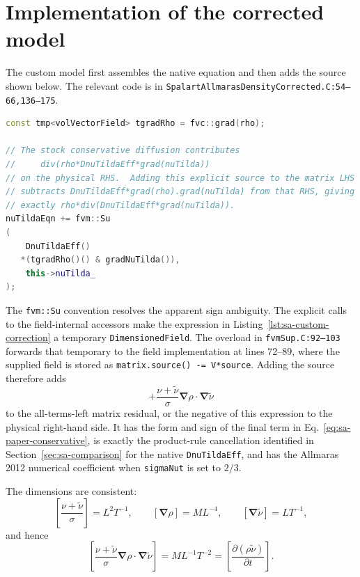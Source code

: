 \documentclass[11pt]{article}
\newcommand{\SAgrad}{\boldsymbol{\nabla}}
\newcommand{\SAcode}[1]{\texttt{#1}}
\begin{document}
\clearpage
\appendix
\section{Implementation of the corrected model}
\label{sec:sa-correction}

The custom model first assembles the native equation and then adds the source
shown below.  The relevant code is in
\SAcode{SpalartAllmarasDensityCorrected.C:54--66,136--175}.
\begin{lstlisting}[style=SAFoam,language=C++,firstnumber=54,
  caption={Density-gradient source in SpalartAllmarasDensityCorrected.},
  label={lst:sa-custom-correction}]
const tmp<volVectorField> tgradRho = fvc::grad(rho);

// The stock conservative diffusion contributes
//     div(rho*DnuTildaEff*grad(nuTilda))
// on the physical RHS.  Adding this explicit source to the matrix LHS
// subtracts DnuTildaEff*grad(rho).grad(nuTilda) from that RHS, giving
// exactly rho*div(DnuTildaEff*grad(nuTilda)).
nuTildaEqn += fvm::Su
(
    DnuTildaEff()
   *(tgradRho()() & gradNuTilda()),
    this->nuTilda_
);
\end{lstlisting}

The \SAcode{fvm::Su} convention resolves the apparent sign ambiguity.  The
explicit calls to the field-internal accessors make the expression in
Listing~\ref{lst:sa-custom-correction} a temporary
\SAcode{DimensionedField}.  The overload in \SAcode{fvmSup.C:92--103}
forwards that temporary to the field implementation at lines 72--89, where the
supplied field is stored as \SAcode{matrix.source() -= V*source}.  Adding the
source therefore adds
\begin{equation}
  +\frac{\nu+\widetilde{\nu}}{\sigma}
  \SAgrad\rho\mathbin{\cdot}\SAgrad\widetilde{\nu}
  \label{eq:sa-custom-residual-source}
\end{equation}
to the all-terms-left matrix residual, or the negative of this expression to
the physical right-hand side.  It has the form and sign of the final term in
Eq.~\eqref{eq:sa-paper-conservative}, is exactly the product-rule cancellation
identified in Section~\ref{sec:sa-comparison} for the native
\SAcode{DnuTildaEff}, and has the Allmaras 2012 numerical coefficient when
\SAcode{sigmaNut} is set to \(2/3\).

The dimensions are consistent:
\begin{equation}
  \left[\frac{\nu+\widetilde{\nu}}{\sigma}\right]=L^2T^{-1},
  \qquad
  [\SAgrad\rho]=ML^{-4},
  \qquad
  [\SAgrad\widetilde{\nu}]=LT^{-1},
  \label{eq:sa-custom-source-factors-dimensions}
\end{equation}
and hence
\begin{equation}
  \left[
    \frac{\nu+\widetilde{\nu}}{\sigma}
    \SAgrad\rho\mathbin{\cdot}\SAgrad\widetilde{\nu}
  \right]
  =ML^{-1}T^{-2}
  =\left[\frac{\partial(\rho\widetilde{\nu})}{\partial t}\right].
  \label{eq:sa-custom-source-dimensions}
\end{equation}
\end{document}
